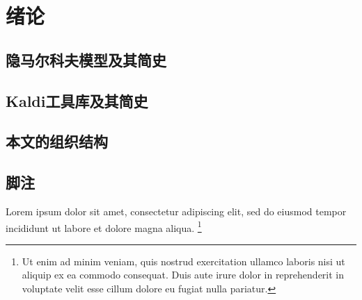 
\chapter{绪论}

\section{隐马尔科夫模型及其简史}

\section{Kaldi工具库及其简史}

\section{本文的组织结构}




\section{脚注}

Lorem ipsum dolor sit amet, consectetur adipiscing elit, sed do eiusmod tempor
incididunt ut labore et dolore magna aliqua.
\footnote{Ut enim ad minim veniam, quis nostrud exercitation ullamco laboris
	nisi ut aliquip ex ea commodo consequat.
	Duis aute irure dolor in reprehenderit in voluptate velit esse cillum dolore
	eu fugiat nulla pariatur.}
